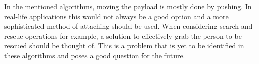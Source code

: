 \begin{table}[H]
  \renewcommand{\arraystretch}{1.3}
  \centering
  \caption{Overview of Collective Transport Algorithms}
  \label{table_alg_coltrans2}
\end{table}


In the mentioned algorithms, moving the payload is mostly done by pushing.
In real-life applications this would not always be a good option and a more sophisticated method of attaching should be used.
When considering search-and-rescue operations for example, a solution to effectively grab the person to be rescued should be thought of.
This is a problem that is yet to be identified in these algorithms and poses a good question for the future.
